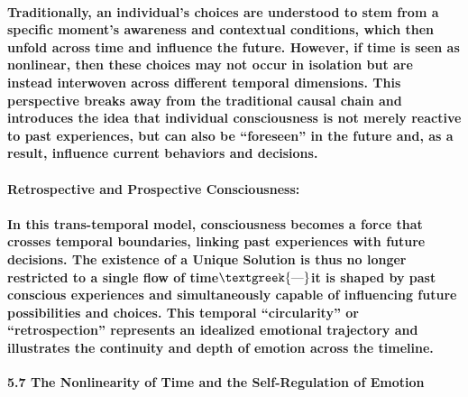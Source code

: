 \documentclass[a4paper]{article}
\begin{document}
\paragraph[Traditionally, an individual{}'s choices are understood to stem from a specific moment{}'s awareness and
contextual conditions, which then unfold across time and influence the future. However, if time is seen as nonlinear,
then these choices may not occur in isolation but are instead interwoven across different temporal dimensions. This
perspective breaks away from the traditional causal chain and introduces the idea that individual consciousness is not
merely reactive to past experiences, but can also be “foreseen” in the future and, as a result, influence current
behaviors and decisions.]{Traditionally, an individual's choices are understood to stem from a specific moment's
awareness and contextual conditions, which then unfold across time and influence the future. However, if time is seen
as nonlinear, then these choices may not occur in isolation but are instead interwoven across different temporal
dimensions. This perspective breaks away from the traditional causal chain and introduces the idea that individual
consciousness is not merely reactive to past experiences, but can also be “foreseen” in the future and, as a result,
influence current behaviors and decisions.}
\paragraph[Retrospective and Prospective Consciousness:]{\textbf{Retrospective and Prospective Consciousness:}}
\paragraph[In this trans{}-temporal model, consciousness becomes a force that crosses temporal boundaries, linking past
experiences with future decisions. The existence of a Unique Solution is thus no longer restricted to a single flow of
time$\text{\textgreek{—}}$it is shaped by past conscious experiences and simultaneously capable of influencing future
possibilities and choices. This temporal “circularity” or “retrospection” represents an idealized emotional trajectory
and illustrates the continuity and depth of emotion across the timeline.]{In this trans-temporal model, consciousness
becomes a force that crosses temporal boundaries, linking past experiences with future decisions. The existence of a
Unique Solution is thus no longer restricted to a single flow of time$\text{\textgreek{—}}$it is shaped by past
conscious experiences and simultaneously capable of influencing future possibilities and choices. This temporal
“circularity” or “retrospection” represents an idealized emotional trajectory and illustrates the continuity and depth
of emotion across the timeline.}
\textbf{5.7 The Nonlinearity of Time and the Self-Regulation of Emotion}
\end{document}
